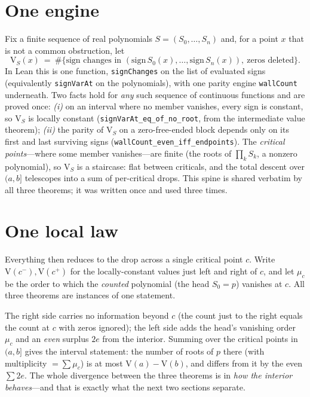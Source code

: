\documentclass[11pt]{article}
\newcommand{\lean}[1]{\texttt{#1}}
\newcommand{\V}{\mathrm{V}}
\newcommand{\keyeq}[1]{\begin{center}\keybox{$\displaystyle #1$}\end{center}}
\begin{document}
\section{One engine}\label{sec:engine}

Fix a finite sequence of real polynomials $S=(S_0,\dots,S_n)$ and, for a point $x$ that is not a
common obstruction, let
\[
  \V_S(x)\ =\ \#\{\text{sign changes in } (\mathrm{sign}\,S_0(x),\dots,\mathrm{sign}\,S_n(x)),\ \text{zeros deleted}\}.
\]
In Lean this is one function, \lean{signChanges} on the list of evaluated signs (equivalently
\lean{signVarAt} on the polynomials), with one parity engine \lean{wallCount} underneath. Two facts hold
for \emph{any} such sequence of continuous functions and are proved once: \emph{(i)} on an interval
where no member vanishes, every sign is constant, so $\V_S$ is locally constant
(\lean{signVarAt\_eq\_of\_no\_root}, from the intermediate value theorem); \emph{(ii)} the parity of
$\V_S$ on a zero-free-ended block depends only on its first and last surviving signs
(\lean{wallCount\_even\_iff\_endpoints}). The \emph{critical points}---where some member vanishes---are
finite (the roots of $\prod_k S_k$, a nonzero polynomial), so $\V_S$ is a staircase: flat between
criticals, and the total descent over $(a,b]$ telescopes into a sum of per-critical drops. This
spine is shared verbatim by all three theorems; it was written once and used three times.

\section{One local law}\label{sec:law}

Everything then reduces to the drop across a single critical point $c$. Write $\V(c^-),\V(c^+)$ for the
locally-constant values just left and right of $c$, and let $\mu_c$ be the order to which the
\emph{counted} polynomial (the head $S_0=p$) vanishes at $c$. All three theorems are instances of one
statement.
\keyeq{\V(c^-)\ =\ \V(c^+)\ +\ \mu_c\ +\ 2e\qquad(\exists\,e\in\mathbb{N}).}
The right side carries no information beyond $c$ (the count just to the right equals the count at $c$
with zeros ignored); the left side adds the head's vanishing order $\mu_c$ and an \emph{even} surplus
$2e$ from the interior. Summing over the critical points in $(a,b]$ gives the interval statement: the
number of roots of $p$ there (with multiplicity $=\sum\mu_c$) is at most $\V(a)-\V(b)$, and differs from
it by the even $\sum 2e$. The whole divergence between the three theorems is in \emph{how the interior
behaves}---and that is exactly what the next two sections separate.
\end{document}
